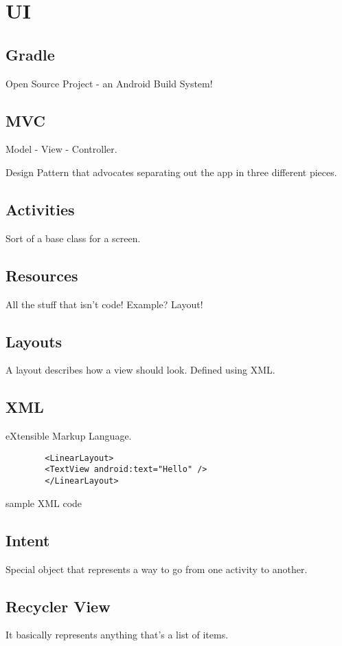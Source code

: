 \chapter{UI}
\section{Gradle}
Open Source Project - an Android Build System!

\section{MVC}
Model - View - Controller.

Design Pattern that advocates separating out the app in three different
pieces.

\section{Activities}
Sort of a base class for a screen.

\section{Resources}
All the stuff that isn't code!
Example? Layout!

\section{Layouts}
A layout describes how a view should look.
Defined using XML.

\section{XML}
eXtensible Markup Language.
\begin{code}
	\begin{verbatim}
		<LinearLayout>
		<TextView android:text="Hello" />
		</LinearLayout>
	\end{verbatim}
	\caption{sample XML code}
\end{code}

\section{Intent}
Special object that represents a way to go from one activity to another.

\section{Recycler View}
It basically represents anything that's a list of items.

